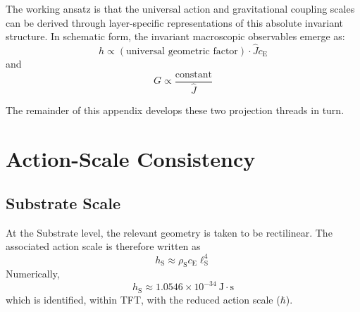 The working ansatz is that the universal action and gravitational coupling scales can be derived through layer-specific representations of this absolute invariant structure. In schematic form, the invariant macroscopic observables emerge as:
\begin{equation}
    h \propto (\text{universal geometric factor}) \cdot \hat{J} c_{\mathrm{E}}
\end{equation}
and
\begin{equation}
    G \propto \frac{\text{constant}}{\hat{J}}
\end{equation}

The remainder of this appendix develops these two projection threads in turn.

\section{Action-Scale Consistency}

\subsection{Substrate Scale}
At the Substrate level, the relevant geometry is taken to be rectilinear. The associated action scale is therefore written as
\begin{equation}
    h_{\mathrm{S}} \approx \rho_{\mathrm{S}} c_{\mathrm{E}} \ell_{\mathrm{S}}^4
\end{equation}
Numerically,
\begin{equation}
    h_{\mathrm{S}} \approx 1.0546 \times 10^{-34}\ \text{J}\cdot\text{s}
\end{equation}
which is identified, within TFT, with the reduced action scale ($\hbar$).

